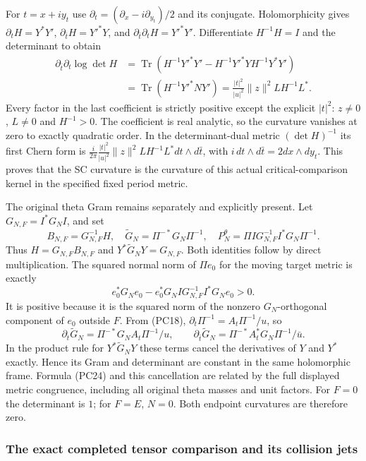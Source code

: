 For $t=x+iy_t$ use
$\partial_t=(\partial_x-i\partial_{y_t})/2$ and its conjugate.
Holomorphicity gives $\partial_tH=Y^*Y'$,
$\partial_{\bar t}H=Y'^*Y$, and
$\partial_{\bar t}\partial_tH=Y'^*Y'$.
Differentiate $H^{-1}H=I$ and the determinant to obtain
\[
\begin{split}
 \partial_{\bar t}\partial_t\log\det H
 &=\operatorname{Tr}(H^{-1}Y'^*Y'
     -H^{-1}Y'^*YH^{-1}Y^*Y')\\
 &=\operatorname{Tr}(H^{-1}Y'^*NY')
   =\frac{|t|^2}{|u|^2}\|z\|^2 L H^{-1}L^*.
\end{split}\tag{PC24}
\]
Every factor in the last coefficient is strictly positive except the
explicit $|t|^2$: $z\ne0$, $L\ne0$ and $H^{-1}>0$.
The coefficient is real analytic, so the curvature vanishes at zero
to exactly quadratic order.  In the determinant-dual metric
$(\det H)^{-1}$ its first Chern form is
$\frac{i}{2\pi}\frac{|t|^2}{|u|^2}\|z\|^2LH^{-1}L^*
dt\wedge d\bar t$, with $i\,dt\wedge d\bar t=2dx\wedge dy_t$.
This proves that the SC curvature is the curvature of this actual
critical-comparison kernel in the specified fixed period metric.

The original theta Gram remains separately and explicitly present.
Let $G_{N,F}=I^*G_NI$, and set
\[
 B_{N,F}=G_{N,F}^{-1}H,\quad
 \widetilde G_N=\Pi^{-*}G_N\Pi^{-1},\quad
 P_N^\theta=\Pi I G_{N,F}^{-1}I^*G_N\Pi^{-1}.
 \tag{PC25}
\]
Thus $H=G_{N,F}B_{N,F}$ and
$Y^*\widetilde G_NY=G_{N,F}$.  Both identities follow by direct
multiplication.  The squared normal norm of $\Pi e_0$ for the
moving target metric is exactly
\[
 e_0^*G_Ne_0-e_0^*G_NI G_{N,F}^{-1}I^*G_Ne_0>0.
 \tag{PC26}
\]
It is positive because it is the squared norm of the nonzero
$G_N$-orthogonal component of $e_0$ outside $F$.  From (PC18),
$\partial_t\Pi^{-1}=A_t\Pi^{-1}/u$, so
\[
 \partial_t\widetilde G_N=\Pi^{-*}G_NA_t\Pi^{-1}/u,
 \qquad
 \partial_{\bar t}\widetilde G_N=
       \Pi^{-*}A_t^*G_N\Pi^{-1}/\bar u.
 \tag{PC27}
\]
In the product rule for $Y^*\widetilde G_NY$ these terms cancel
the derivatives of $Y$ and $Y^*$ exactly.  Hence its Gram and
determinant are constant in the same holomorphic frame.  Formula
(PC24) and this cancellation are related by the full displayed
metric congruence, including all original theta masses and unit factors.
For $F=0$ the determinant is $1$; for $F=E$, $N=0$.
Both endpoint curvatures are therefore zero.

\subsubsection{The exact completed tensor comparison and its collision jets}

